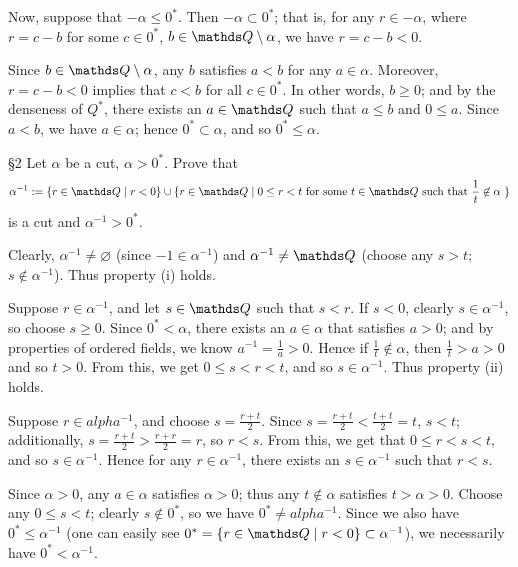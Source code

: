 \documentclass{homework}
\begin{document}
\begin{solution}
\begin{enumerate}[label=(\alph*)]
      Now, suppose that $-\alpha\le 0^*$. Then $-\alpha\subset 0^*$; that is, for any $r\in
      -\alpha$, where $r=c-b$ for some $c\in 0^*$, $b\in \Q\setminus \alpha$, we have $r=c-b<0$.

      Since $b\in \Q\setminus \alpha$, any $b$ satisfies $a<b$ for any $a\in \alpha$. Moreover,
      $r=c-b<0$ implies that $c<b$ for all $c\in 0^*$. In other words, $b\ge 0$; and by the
      denseness of $Q^*$, there exists an $a\in \Q$ such that $a\le b$ and $0\le a$. Since $a<b$, we
      have $a\in \alpha$; hence $0^*\subset \alpha$, and so $0^*\le \alpha$.
  \end{enumerate}
\end{solution}

\begin{problem}{\S 2}
  Let $ \alpha$ be a cut, $\alpha>0^*$. Prove that \[
    \alpha^{-1} := \{r\in \Q\mid r<0\} \cup \{r\in \Q\mid 0\le r<t~\text{for some $t\in \Q$ such that
    $\frac{1}{t}\not\in \alpha$}~\} 
  \] is a cut and $\alpha^{-1}>0^*$.
\end{problem}
\begin{solution}
  Clearly, $ \alpha^{-1}\neq \varnothing$ (since $-1\in \alpha^{-1}$) and $ \alpha^{-1}\neq \Q$
  (choose any $s>t$; $s\not\in \alpha^{-1}$). Thus property (i) holds.

  Suppose $r\in \alpha^{-1}$, and let $s \in \Q$ such that $s<r$. If $s<0$, clearly $s \in
  \alpha^{-1}$, so choose $s\ge 0$. Since $0^*<\alpha$, there exists an $a\in \alpha$ that satisfies
  $a>0$; and by properties of ordered fields, we know $a^{-1}=\frac{1}{a}>0$. Hence if
  $\frac{1}{t}\not\in \alpha$, then $\frac{1}{t}>a>0$ and so $t>0$. From this, we get $0\le s<r<t$,
  and so $s \in \alpha^{-1}$. Thus property (ii) holds.

  Suppose $r\in alpha^{-1}$, and choose $s=\frac{r+t}{2}$. Since $s=\frac{r+t}{2}<\frac{t+t}{2}=t$,
  $s<t$; additionally, $s=\frac{r+t}{2}>\frac{r+r}{2}=r$, so $r<s$. From this, we get that $0\le
  r<s<t$, and so $s \in \alpha^{-1}$. Hence for any $r\in\alpha^{-1}$, there exists an $s \in
  \alpha^{-1}$ such that $r<s$.

  Since $\alpha>0$, any $a\in \alpha$ satisfies $\alpha>0$; thus any $t\not\in \alpha$ satisfies
  $t>\alpha>0$. Choose any $0\le s<t$; clearly $s\not\in 0^*$, so we have $0^*\neq alpha^{-1}$.
  Since we also have $0^*\le  \alpha^{-1}$ (one can easily see $0^*=\{r\in \Q\mid r<0\}\subset
  \alpha^{-1} $), we necessarily have $0^* < \alpha^{-1}$.
\end{solution}
\end{document}
